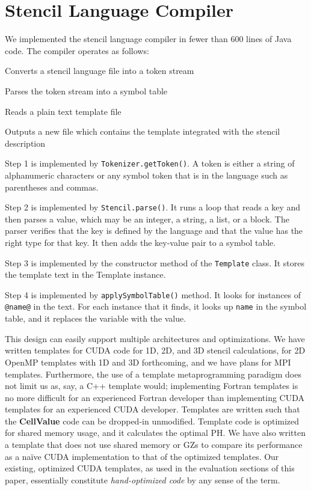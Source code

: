 \documentclass{sig-alternate}
\begin{document}
\section{Stencil Language Compiler}

We implemented the stencil language compiler in fewer than 600 lines of Java
code.  The compiler operates as follows:
\begin{enumerate*}
\item Converts a stencil language file into a token stream
\item Parses the token stream into a symbol table
\item Reads a plain text template file
\item Outputs a new file which contains the template integrated with the
  stencil description
\end{enumerate*}

Step 1 is implemented by {\tt Tokenizer.getToken()}.  A token is either a
string of alphanumeric characters or any symbol token that is in the language
such as parentheses and commas.

Step 2 is implemented by {\tt Stencil.parse()}.  It runs a loop that reads a
key and then parses a value, which may be an integer, a string, a list, or a
block.  The parser verifies that the key is defined by the language and that
the value has the right type for that key.  It then adds the key-value pair
to a symbol table.

Step 3 is implemented by the constructor method of the {\tt Tem\-plate} class.
It stores the template text in the Template instance.

Step 4 is implemented by {\tt applySymbolTable()} method.  It looks for
instances of {\tt @name@} in the text.  For each instance that it finds, it
looks up {\tt name} in the symbol table, and it replaces the variable with
the value.

This design can easily support multiple architectures and optimizations.  We
have written templates for CUDA code for 1D, 2D, and 3D stencil calculations,
for 2D OpenMP templates with 1D and 3D forthcoming, and we have plans for MPI
templates.  Furthermore, the use of a template metaprogramming paradigm does
not limit us as, say, a C++ template would; implementing Fortran templates is
no more difficult for an experienced Fortran developer than implementing CUDA
templates for an experienced CUDA developer.  Templates are written such that
the {\bf CellValue} code can be dropped-in unmodified.  Template code is
optimized for shared memory usage, and it calculates the optimal PH.  We have
also written a template that does not use shared memory or GZs to compare its
performance as a na\"{i}ve CUDA implementation to that of the optimized
templates.  Our existing, optimized CUDA templates, as used in the evaluation
sections of this paper, essentially constitute {\em hand-optimized code} by
any sense of the term.
\end{document}
